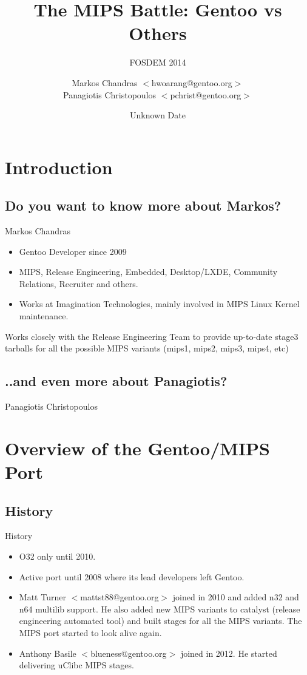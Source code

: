 \documentclass{beamer}
\title{The MIPS Battle: Gentoo vs Others}
\subtitle{FOSDEM 2014}
\author[Markos Chandras \& Panagiotis Christopoulos]{Markos Chandras $<$hwoarang@gentoo.org$>$ \\ Panagiotis Christopoulos $<$pchrist@gentoo.org$>$}
\date{Unknown Date}
\begin{document}
\frame{\titlepage}

\section{Introduction}

\subsection{Do you want to know more about Markos?}

\begin{frame}{Markos Chandras}
	\begin{itemize}
		\item Gentoo Developer since 2009
		\item MIPS, Release Engineering, Embedded, Desktop/LXDE, Community Relations, Recruiter and others.
		\item Works at Imagination Technologies, mainly involved in MIPS Linux Kernel maintenance.
	\end{itemize}
	Works closely with the Release Engineering Team to provide up-to-date stage3 tarballs for all the possible MIPS variants (mips1, mips2, mips3, mips4, etc)
\end{frame}

\subsection{..and even more about Panagiotis?}
\begin{frame}{Panagiotis Christopoulos}
\end{frame}

\section{Overview of the Gentoo/MIPS Port}

\subsection{History}

\begin{frame}{History}
	\begin{itemize}
		\item O32 only until 2010.
		\item Active port until 2008 where its lead developers left Gentoo.
		\item Matt Turner $<$mattst88@gentoo.org$>$ joined in 2010 and added n32 and n64 multilib support. He also added new MIPS variants to catalyst (release engineering automated tool) and built stages for all the MIPS
	variants. The MIPS port started to look alive again.
		\item Anthony Basile $<$blueness@gentoo.org$>$ joined in 2012. He started delivering uClibc MIPS stages.
	\end{itemize}
\end{frame}
\end{document}
